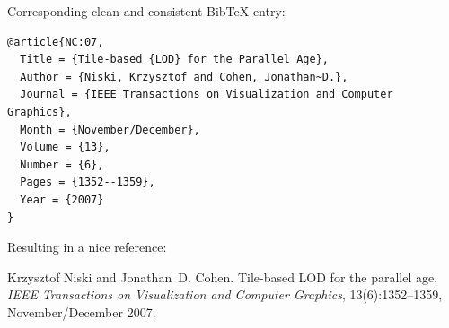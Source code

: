 \documentclass[11pt, a4paper,oneside,chapterprefix=false]{scrbook}
\begin{document}
\bigskip
\noindent
Corresponding clean and consistent BibTeX entry:

\begin{verbatim}
@article{NC:07,
  Title = {Tile-based {LOD} for the Parallel Age},
  Author = {Niski, Krzysztof and Cohen, Jonathan~D.},
  Journal = {IEEE Transactions on Visualization and Computer Graphics},
  Month = {November/December},
  Volume = {13},
  Number = {6},
  Pages = {1352--1359},
  Year = {2007}
}
\end{verbatim}

\noindent
Resulting in a nice reference:

\smallskip
\noindent
[NC07]  Krzysztof Niski and Jonathan D. Cohen. Tile-based LOD for the parallel age. {\em IEEE Transactions on Visualization and Computer Graphics}, 13(6):1352–1359, November/December 2007.


%



\end{document}
